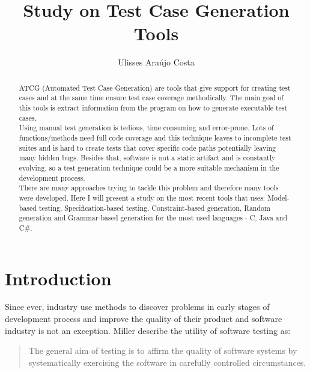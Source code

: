 \documentclass[citeauthoryear]{llncs}
\title{Study on Test Case Generation Tools}
\author{Ulisses Araújo Costa}
\institute{Department of Informatics, University of Minho\\ Campus de Gualtar, 4710-057 Braga, Portugal\\
\email{ulissesmonhecosta@gmail.com}
}
\begin{document}
\maketitle
\begin{abstract}
ATCG (Automated Test Case Generation) are tools that give support for creating test cases and at the same time ensure test case coverage methodically.
The main goal of this tools is extract information from the program on how to generate executable test cases.\\
Using  manual test generation is tedious, time consuming and error-prone. Lots of functions/methods need full code coverage and this technique leaves
to incomplete test suites and is hard to create tests that cover specific code paths potentially leaving many hidden bugs.
Besides that, software is not a static artifact and is constantly evolving, so a test generation technique could be a more suitable mechanism in the development process.\\
There are many approaches trying to tackle this problem and therefore many tools were developed. Here I will present a study on the most recent tools that uses:
Model-based testing, Specification-based testing, Constraint-based generation, Random generation and Grammar-based generation for the most used languages - C, Java and C\#.
\end{abstract}

\section{Introduction}
Since ever, industry use methods to discover problems in early stages of development process and improve
the quality of their product and software industry is not an exception. Miller\cite{miller} describe the utility
of software testing as:

\begin{quotation}
The general aim of testing is to affirm the quality of software systems by systematically
exercising the software in carefully controlled circumstances.
\end{quotation}
\end{document}

